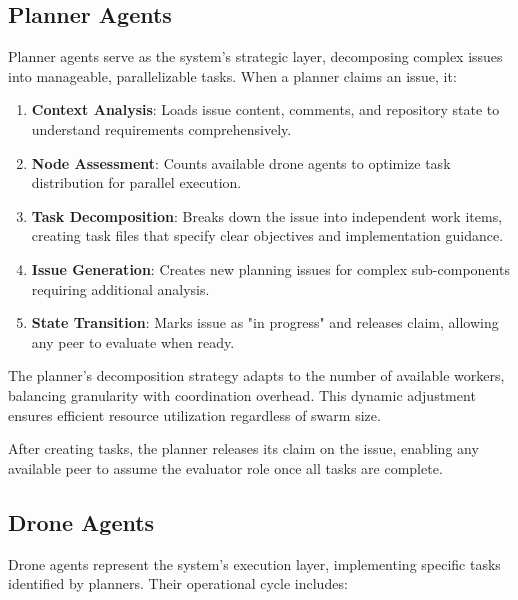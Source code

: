 \documentclass[11pt,a4paper]{article}
\begin{document}
\subsection{Planner Agents}

Planner agents serve as the system's strategic layer, decomposing complex issues into manageable, parallelizable tasks. When a planner claims an issue, it:

\begin{enumerate}
    \item \textbf{Context Analysis}: Loads issue content, comments, and repository state to understand requirements comprehensively.
    
    \item \textbf{Node Assessment}: Counts available drone agents to optimize task distribution for parallel execution.
    
    \item \textbf{Task Decomposition}: Breaks down the issue into independent work items, creating task files that specify clear objectives and implementation guidance.
    
    \item \textbf{Issue Generation}: Creates new planning issues for complex sub-components requiring additional analysis.
    
    \item \textbf{State Transition}: Marks issue as "in progress" and releases claim, allowing any peer to evaluate when ready.
\end{enumerate}

The planner's decomposition strategy adapts to the number of available workers, balancing granularity with coordination overhead. This dynamic adjustment ensures efficient resource utilization regardless of swarm size.

After creating tasks, the planner releases its claim on the issue, enabling any available peer to assume the evaluator role once all tasks are complete.

\subsection{Drone Agents}

Drone agents represent the system's execution layer, implementing specific tasks identified by planners. Their operational cycle includes:
\end{document}
